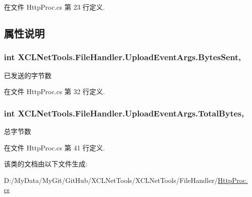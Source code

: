 在文件 Http\-Proc.\-cs 第 23 行定义.



\subsection{属性说明}
\hypertarget{class_x_c_l_net_tools_1_1_file_handler_1_1_upload_event_args_aeb753c87413d86d610121060635794e1}{
\subsubsection[{Bytes\-Sent}]{\setlength{\rightskip}{0pt plus 5cm}int X\-C\-L\-Net\-Tools.\-File\-Handler.\-Upload\-Event\-Args.\-Bytes\-Sent\hspace{0.3cm}{\ttfamily [get]}, {\ttfamily [set]}}}\label{class_x_c_l_net_tools_1_1_file_handler_1_1_upload_event_args_aeb753c87413d86d610121060635794e1}


已发送的字节数 



在文件 Http\-Proc.\-cs 第 32 行定义.

\hypertarget{class_x_c_l_net_tools_1_1_file_handler_1_1_upload_event_args_a874a8bc16016a3d11eb9aa52f9670eb4}{
\subsubsection[{Total\-Bytes}]{\setlength{\rightskip}{0pt plus 5cm}int X\-C\-L\-Net\-Tools.\-File\-Handler.\-Upload\-Event\-Args.\-Total\-Bytes\hspace{0.3cm}{\ttfamily [get]}, {\ttfamily [set]}}}\label{class_x_c_l_net_tools_1_1_file_handler_1_1_upload_event_args_a874a8bc16016a3d11eb9aa52f9670eb4}


总字节数 



在文件 Http\-Proc.\-cs 第 41 行定义.



该类的文档由以下文件生成\-:\begin{DoxyCompactItemize}
\item 
D\-:/\-My\-Data/\-My\-Git/\-Git\-Hub/\-X\-C\-L\-Net\-Tools/\-X\-C\-L\-Net\-Tools/\-File\-Handler/\hyperlink{_http_proc_8cs}{Http\-Proc.\-cs}\end{DoxyCompactItemize}

